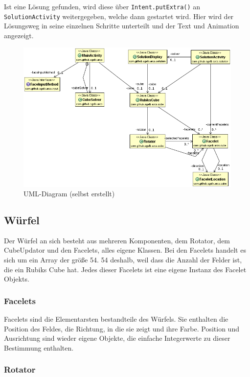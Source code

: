 Ist eine Lösung gefunden, wird diese über \texttt{Intent.putExtra()} an
\texttt{SolutionActivity} weitergegeben, welche dann gestartet wird. Hier wird
der Lösungsweg in seine einzelnen Schritte unterteilt und der Text und Animation
angezeigt.



\begin{figure}[ht!]
  \centering
  \includegraphics[width=\textwidth]{pics/uml.png}
  \caption{UML-Diagram (selbst erstellt)}
  \label{fig:uml}
\end{figure}


\subsection{Würfel}

Der Würfel an sich besteht aus mehreren Komponenten, dem Rotator, dem
CubeUpdator und den Facelets, alles eigene Klassen. Bei den Facelets handelt es
sich um ein Array der größe 54. 54 deshalb, weil dass die Anzahl der Felder ist,
die ein Rubiks Cube hat. Jedes dieser Facelets ist eine eigene Instanz des
Facelet Objekts.

\subsubsection{Facelets}

Facelets sind die Elementarsten bestandteile des Würfels. Sie enthalten die
Position des Feldes, die Richtung, in die sie zeigt und ihre Farbe. Position und
Ausrichtung sind wieder eigene Objekte, die einfache Integerwerte zu dieser
Bestimmung enthalten.

\subsubsection{Rotator}

